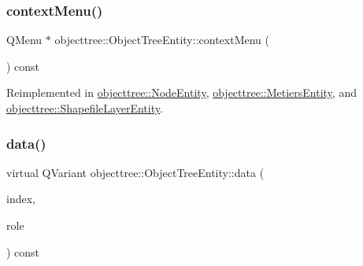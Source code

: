 \subsubsection{\texorpdfstring{contextMenu()}{contextMenu()}}
{\footnotesize\ttfamily Q\+Menu $\ast$ objecttree\+::\+Object\+Tree\+Entity\+::context\+Menu (\begin{DoxyParamCaption}{ }\end{DoxyParamCaption}) const\hspace{0.3cm}{\ttfamily [virtual]}}



Reimplemented in \mbox{\hyperlink{classobjecttree_1_1_node_entity_a03445bba05e894cefaa96aeb49abeacc}{objecttree\+::\+Node\+Entity}}, \mbox{\hyperlink{classobjecttree_1_1_metiers_entity_a1cb1d02a1cf0d048589b2b6844d971e8}{objecttree\+::\+Metiers\+Entity}}, and \mbox{\hyperlink{classobjecttree_1_1_shapefile_layer_entity_a576599710112cc0f18dc6ae86ae317c3}{objecttree\+::\+Shapefile\+Layer\+Entity}}.

\mbox{\label{classobjecttree_1_1_object_tree_entity_a2413c6573de18b451d97eb3800f10f35}} 
\subsubsection{\texorpdfstring{data()}{data()}}
{\footnotesize\ttfamily virtual Q\+Variant objecttree\+::\+Object\+Tree\+Entity\+::data (\begin{DoxyParamCaption}\item[{const Q\+Model\+Index \&}]{index,  }\item[{int}]{role }\end{DoxyParamCaption}) const\hspace{0.3cm}{\ttfamily [pure virtual]}}



